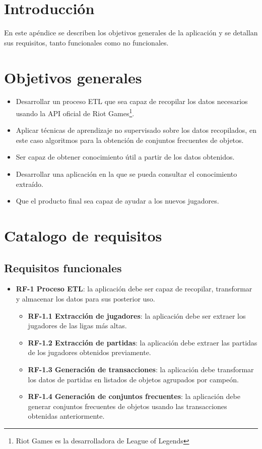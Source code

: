 
\section{Introducción}

En este apéndice se describen los objetivos generales de la aplicación y se detallan sus requisitos, tanto funcionales como no funcionales.

\section{Objetivos generales}
\begin{itemize}
    \item Desarrollar un proceso ETL que sea capaz de recopilar los datos necesarios usando la API oficial de Riot Games\footnote{Riot Games es la desarrolladora de League of Legends}.
	\item Aplicar técnicas de aprendizaje no supervisado sobre los datos recopilados, en este caso algoritmos para la obtención de conjuntos frecuentes de objetos.
	\item Ser capaz de obtener conocimiento útil a partir de los datos obtenidos.
	\item Desarrollar una aplicación en la que se pueda consultar el conocimiento extraído.
	\item Que el producto final sea capaz de ayudar a los nuevos jugadores.
\end{itemize}

\section{Catalogo de requisitos}
\subsection{Requisitos funcionales}
\begin{itemize}
	\item \textbf{RF-1 Proceso ETL}: la aplicación debe ser capaz de recopilar, transformar y almacenar los datos para sus posterior uso.
	\begin{itemize}
		\item \textbf{RF-1.1 Extracción de jugadores}: la aplicación debe ser extraer los jugadores de las ligas más altas.
		\item \textbf{RF-1.2 Extracción de partidas}: la aplicación debe extraer las partidas de los jugadores obtenidos previamente.
		\item \textbf{RF-1.3 Generación de transacciones}: la aplicación debe transformar los datos de partidas en listados de objetos agrupados por campeón.
		\item \textbf{RF-1.4 Generación de conjuntos frecuentes}: la aplicación debe generar conjuntos frecuentes de objetos usando las transacciones obtenidas anteriormente.
	\end{itemize}
\end{itemize}

